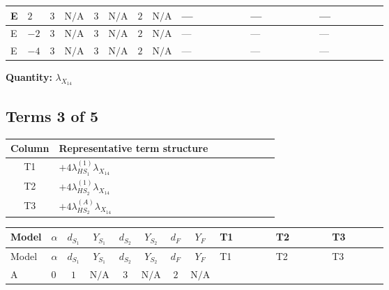 \documentclass[8pt]{article}
\begin{document}
\begin{landscape}
\begin{longtable}{@{}llcccccc >{\raggedright\arraybackslash}p{0.21\linewidth} >{\raggedright\arraybackslash}p{0.21\linewidth} >{\raggedright\arraybackslash}p{0.21\linewidth}@{}}
\midrule
E & $2$ & $3$ & $\text{N/A}$ & $3$ & $\text{N/A}$ & $2$ & $\text{N/A}$ & --- & --- & --- \\
\midrule
E & $-2$ & $3$ & $\text{N/A}$ & $3$ & $\text{N/A}$ & $2$ & $\text{N/A}$ & --- & --- & --- \\
\midrule
E & $-4$ & $3$ & $\text{N/A}$ & $3$ & $\text{N/A}$ & $2$ & $\text{N/A}$ & --- & --- & --- \\
\midrule
\bottomrule
\end{longtable}
\clearpage
\noindent\textbf{Quantity: }${\lambda_{X_{14}}}$\par\smallskip
\subsection*{Terms 3 of 5}
\begin{center}
\begin{tabular}{@{}c >{\raggedright\arraybackslash}p{0.82\linewidth}@{}}
\toprule
Column & Representative term structure \\
\midrule
T1 & \(\displaystyle +4 {\lambda_{HS_1}^{(1)}} {\lambda_{X_{14}}}\) \\
\midrule
T2 & \(\displaystyle +4 {\lambda_{HS_2}^{(1)}} {\lambda_{X_{14}}}\) \\
\midrule
T3 & \(\displaystyle +4 {\lambda_{HS_2}^{(A)}} {\lambda_{X_{14}}}\) \\
\midrule
\bottomrule
\end{tabular}
\end{center}
\smallskip
\tiny
\begin{longtable}{@{}llcccccc >{\raggedright\arraybackslash}p{0.21\linewidth} >{\raggedright\arraybackslash}p{0.21\linewidth} >{\raggedright\arraybackslash}p{0.21\linewidth}@{}}
\toprule
Model & $\alpha$ & $d_{S_1}$ & $Y_{S_1}$ & $d_{S_2}$ & $Y_{S_2}$ & $d_F$ & $Y_F$ & T1 & T2 & T3 \\
\midrule
\endfirsthead
\toprule
Model & $\alpha$ & $d_{S_1}$ & $Y_{S_1}$ & $d_{S_2}$ & $Y_{S_2}$ & $d_F$ & $Y_F$ & T1 & T2 & T3 \\
\midrule
\endhead
A & $0$ & $1$ & $\text{N/A}$ & $3$ & $\text{N/A}$ & $2$ & $\text{N/A}$ & \scriptsize\adjustbox{max width=\linewidth}{$\begin{gathered} +4 {\lambda_{HS_1}^{(1)}} {\lambda_{X_{14}}}\end{gathered}$} & \scriptsize\adjustbox{max width=\linewidth}{$\begin{gathered} +4 {\lambda_{HS_2}^{(1)}} {\lambda_{X_{14}}}\end{gathered}$} & \scriptsize\adjustbox{max width=\linewidth}{$\begin{gathered} +4 {\lambda_{HS_2}^{(A)}} {\lambda_{X_{14}}}\end{gathered}$} \\

\end{longtable}
\end{landscape}
\end{document}

